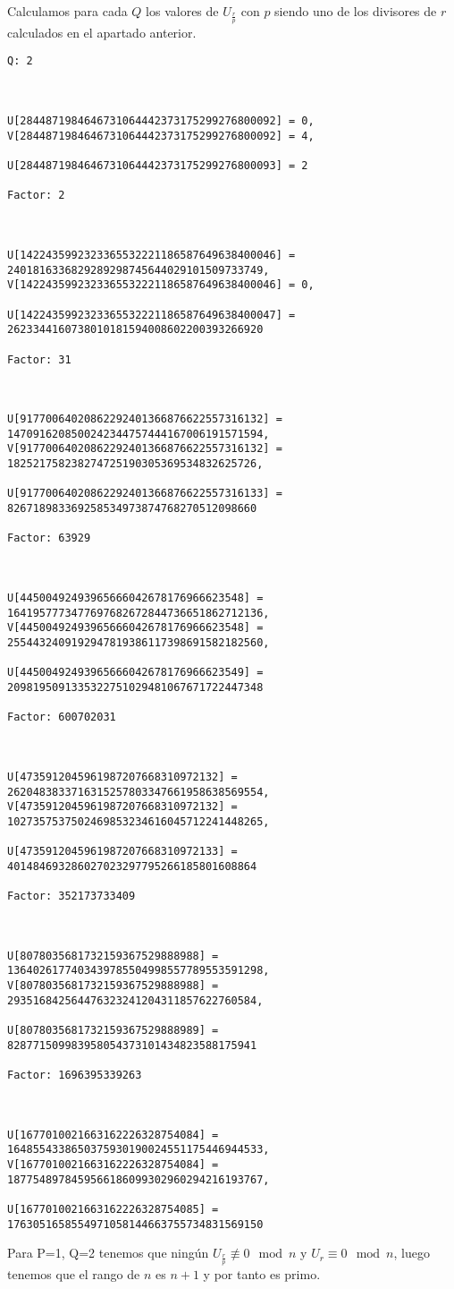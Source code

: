 \documentclass[a4paper]{article}
\begin{document}
Calculamos para cada $Q$ los valores de $U_{\frac{r}{p}}$ con $p$ siendo uno de los divisores de $r$ calculados en el apartado anterior.

\begin{verbatim}
Q: 2



U[2844871984646731064442373175299276800092] = 0, 
V[2844871984646731064442373175299276800092] = 4, 

U[2844871984646731064442373175299276800093] = 2

Factor: 2



U[1422435992323365532221186587649638400046] = 2401816336829289298745644029101509733749, 
V[1422435992323365532221186587649638400046] = 0, 

U[1422435992323365532221186587649638400047] = 2623344160738010181594008602200393266920

Factor: 31



U[91770064020862292401366876622557316132] = 1470916208500242344757444167006191571594, 
V[91770064020862292401366876622557316132] = 182521758238274725190305369534832625726, 

U[91770064020862292401366876622557316133] = 826718983369258534973874768270512098660

Factor: 63929



U[44500492493965666042678176966623548] = 1641957773477697682672844736651862712136, 
V[44500492493965666042678176966623548] = 2554432409192947819386117398691582182560, 

U[44500492493965666042678176966623549] = 2098195091335322751029481067671722447348

Factor: 600702031



U[4735912045961987207668310972132] = 2620483833716315257803347661958638569554, 
V[4735912045961987207668310972132] = 1027357537502469853234616045712241448265, 

U[4735912045961987207668310972133] = 401484693286027023297795266185801608864

Factor: 352173733409



U[8078035681732159367529888988] = 1364026177403439785504998557789553591298, 
V[8078035681732159367529888988] = 293516842564476323241204311857622760584, 

U[8078035681732159367529888989] = 828771509983958054373101434823588175941

Factor: 1696395339263



U[1677010021663162226328754084] = 1648554338650375930190024551175446944533, 
V[1677010021663162226328754084] = 1877548978459566186099302960294216193767, 

U[1677010021663162226328754085] = 1763051658554971058144663755734831569150
\end{verbatim}


Para P=1, Q=2 tenemos que ningún $U_{\frac{r}{p}}\not\equiv 0\mod n$ y $U_r\equiv 0\mod n$, luego tenemos que el rango de $n$ es $n+1$ y por tanto es primo.
\end{document}

